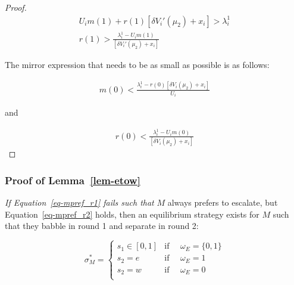 \documentclass[
  12pt,
]{article}
\theoremstyle{plain}
\theoremstyle{plain}
\theoremstyle{remark}
\begin{document}
\begin{proof}
\[
\begin{aligned}
U_i m(1) + r(1)[ \delta V_i'(\mu_2) + x_i] > \lambda^1_i\\
r(1) > \frac{\lambda^1_i - U_i m(1)}{[\delta V_i'(\mu_2) + x_i ]}
\end{aligned}
\]

The mirror expression that needs to be as small as possible is as
follows:

\[
\begin{aligned}
m(0) < \frac{\lambda^1_i -r(0)[\delta V_i(\mu_2) + x_i ]}{U_i}
\end{aligned}
\]

and

\[
\begin{aligned}
r(0) < \frac{\lambda^1_i - U_i m(0)}{[\delta V_i(\mu_2) + x_i ]}
\end{aligned}
\]
\end{proof}

\subsubsection{\texorpdfstring{Proof of
Lemma~\ref{lem-etow}}{Proof of Lemma~}}\label{proof-of-lem-etow}

\emph{If Equation~\ref{eq-mpref_r1} fails such that} \(M\) always
prefers to escalate, but Equation~\ref{eq-mpref_r2} holds, then an
equilibrium strategy exists for \(M\) such that they babble in round 1
and separate in round 2:

\[
\sigma^{*}_M = 
\begin{cases}
s_1 \in [0, 1] & \text{if } \quad \omega_E = \{0, 1\} \\
s_2 = e  & \text{if } \quad \omega_E = 1\\
s_2 = w  & \text{if } \quad \omega_E = 0\\
\end{cases}
\]
\end{document}
